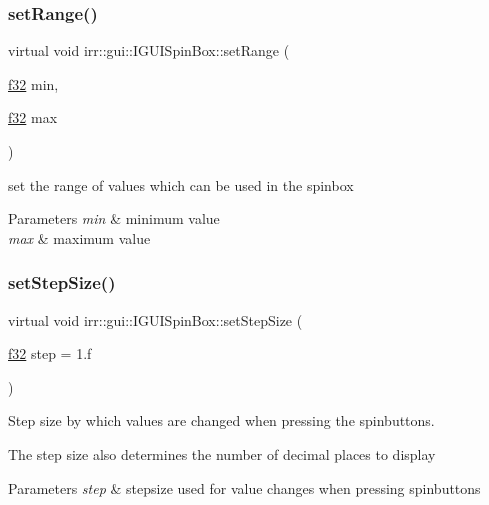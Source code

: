\subsubsection{\texorpdfstring{set\+Range()}{setRange()}}
{\footnotesize\ttfamily virtual void irr\+::gui\+::\+I\+G\+U\+I\+Spin\+Box\+::set\+Range (\begin{DoxyParamCaption}\item[{\hyperlink{namespaceirr_a0277be98d67dc26ff93b1a6a1d086b07}{f32}}]{min,  }\item[{\hyperlink{namespaceirr_a0277be98d67dc26ff93b1a6a1d086b07}{f32}}]{max }\end{DoxyParamCaption})\hspace{0.3cm}{\ttfamily [pure virtual]}}



set the range of values which can be used in the spinbox 


\begin{DoxyParams}{Parameters}
{\em min} & minimum value \\
\hline
{\em max} & maximum value \\
\hline
\end{DoxyParams}
\mbox{\label{classirr_1_1gui_1_1IGUISpinBox_a64296e93b52129fcf9068279baf0697d}} 
\subsubsection{\texorpdfstring{set\+Step\+Size()}{setStepSize()}}
{\footnotesize\ttfamily virtual void irr\+::gui\+::\+I\+G\+U\+I\+Spin\+Box\+::set\+Step\+Size (\begin{DoxyParamCaption}\item[{\hyperlink{namespaceirr_a0277be98d67dc26ff93b1a6a1d086b07}{f32}}]{step = {\ttfamily 1.f} }\end{DoxyParamCaption})\hspace{0.3cm}{\ttfamily [pure virtual]}}



Step size by which values are changed when pressing the spinbuttons. 

The step size also determines the number of decimal places to display 
\begin{DoxyParams}{Parameters}
{\em step} & stepsize used for value changes when pressing spinbuttons \\
\hline
\end{DoxyParams}
\mbox{\label{classirr_1_1gui_1_1IGUISpinBox_a28e388e3767d4257f712d899c744bc20}} 
